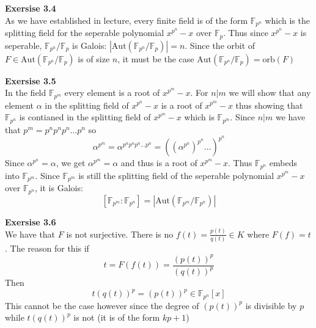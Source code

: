 \documentclass[12pt]{article}
\newenvironment{ques}[1]{\textbf{Exersise #1}\vspace{1 mm}\\ }{\bigskip}
\theoremstyle{definition}
\newcommand{\F}{\mathbb F}
\renewcommand{\a}{\alpha}
\newcommand{\Aut}{\text{Aut}}
\begin{document}
\begin{ques}{3.4}
	As we have established in lecture, every finite field is of the form
	$\F_{p^n}$ which is the splitting field for the seperable polynomial
	$x^{p^n}-x$ over $\F_p$. Thus since $x^{p^n}-x$ is seperable,
	$\F_{p^n}/\F_p$ is Galois: $|\Aut(\F_{p^n}/\F_p)| = n$. Since the orbit of
	$F \in \Aut(\F_{p^n}/\F_p)$ is of size $n$, it must be the case
	$\Aut(\F_{p^n}/\F_p) = \text{orb}(F)$
\end{ques}

\begin{ques}{3.5}
	In the field $\F_{p^m}$ every element is a root of $x^{p^m} - x$. For $n|m$
	we will show that any element $\a$ in the splitting field of $x^{p^n} - x$
	is a root of $x^{p^m} - x$ thus showing that $\F_{p^n}$ is contianed in the
	splitting field of $x^{p^m} - x$ which is $\F_{p^m}$. Since $n|m$ we have
	that $p^m = p^np^np^n \dots p^n$ so 
	$$\a^{p^m} = \a^{p^np^np^n \dots p^n} = ((\a^{p^n})^{p^n} \dots )^{p^n}$$
	Since $\a^{p^n} = \a$, we get $\a^{p^m} = \a$ and thus is a root of
	$x^{p^m} - x$. Thus $\F_{p^n}$ embeds into $\F_{p^m}$. Since $\F_{p^m}$ is
	still the splitting field of the seperable polynomial $x^{p^m} - x$ over
	$\F_{p^n}$, it is Galois:
	$$[\F_{p^m} : \F_{p^n}] = |\Aut(\F_{p^m} / \F_{p^n})|$$
\end{ques}

\begin{ques}{3.6}
	We have that $F$ is not surjective. There is no $f(t) = \frac{p(t)}{q(t)}
	\in K$ where $F(f) = t$. The reason for this if
	$$t = F(f(t)) = \frac{(p(t))^p}{(q(t))^p}$$
	Then
	$$t(q(t))^p = (p(t))^p \in \F_{p^n}[x]$$
	This cannot be the case however since the degree of $(p(t))^p$ is divisible
	by $p$ while $t(q(t))^p$ is not (it is of the form $kp + 1$)
\end{ques}
\end{document}
